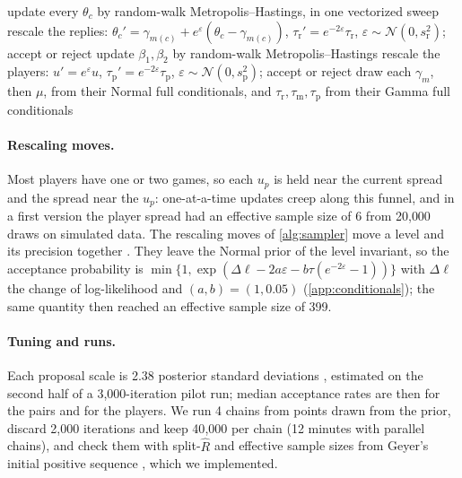 \documentclass[12pt]{article}
\newcommand{\Normal}{\mathcal{N}}
\newcommand{\taum}{\tau_{\mathrm{m}}}
\newcommand{\taur}{\tau_{\mathrm{r}}}
\newcommand{\taup}{\tau_{\mathrm{p}}}
\begin{document}
\begin{algorithm}[t]
\caption{One iteration of the sampler of the final model.}\label{alg:sampler}
\DontPrintSemicolon
update every $\theta_c$ by random-walk Metropolis--Hastings, in one vectorized sweep\;
rescale the replies: $\theta_c' = \gamma_{m(c)} + e^{\varepsilon}(\theta_c - \gamma_{m(c)})$, $\taur' = e^{-2\varepsilon}\taur$, $\varepsilon \sim \Normal(0, s_{\mathrm{r}}^2)$; accept or reject\;
update $\beta_1, \beta_2$ by random-walk Metropolis--Hastings\;
rescale the players: $u' = e^{\varepsilon} u$, $\taup' = e^{-2\varepsilon}\taup$, $\varepsilon \sim \Normal(0, s_{\mathrm{p}}^2)$; accept or reject\;
draw each $\gamma_m$, then $\mu$, from their Normal full conditionals, and $\taur, \taum, \taup$ from their Gamma full conditionals\;
\end{algorithm}

\paragraph{Rescaling moves.} Most players have one or two games, so each $u_p$ is held near the current spread and the spread near the $u_p$: one-at-a-time updates creep along this funnel, and in a first version the player spread had an effective sample size of 6 from 20{,}000 draws on simulated data. The rescaling moves of \cref{alg:sampler} move a level and its precision together \citep{liu2000generalised}. They leave the Normal prior of the level invariant, so the acceptance probability is $\min\{1, \exp(\Delta\ell - 2a\varepsilon - b\tau(e^{-2\varepsilon} - 1))\}$ with $\Delta\ell$ the change of log-likelihood and $(a, b) = (1, 0.05)$ (\cref{app:conditionals}); the same quantity then reached an effective sample size of 399.

\paragraph{Tuning and runs.} Each proposal scale is 2.38 posterior standard deviations \citep{roberts1997weak}, estimated on the second half of a 3{,}000-iteration pilot run; median acceptance rates are then \acceptTheta{} for the pairs and \acceptPlayers{} for the players. We run 4 chains from points drawn from the prior, discard 2{,}000 iterations and keep 40{,}000 per chain (12 minutes with parallel chains), and check them with split-$\hat R$ \citep{gelman1992inference} and effective sample sizes from Geyer's initial positive sequence \citep{geyer1992practical}, which we implemented.
\end{document}
